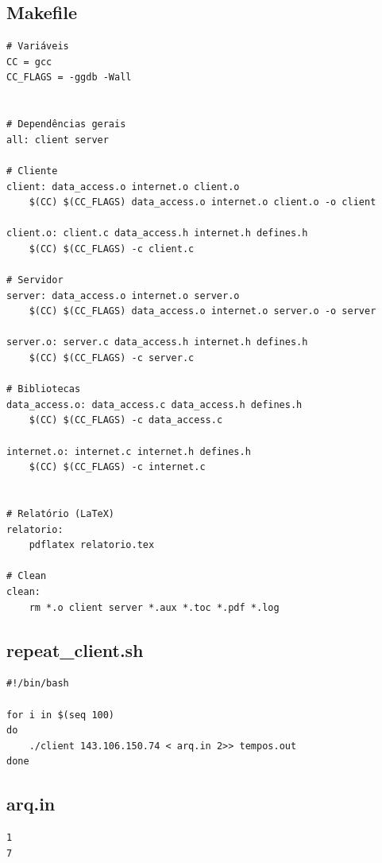 \documentclass[11pt,twoside]{article}
\begin{document}
\subsection{Makefile}
\begin{verbatim}
# Variáveis
CC = gcc
CC_FLAGS = -ggdb -Wall


# Dependências gerais
all: client server

# Cliente
client: data_access.o internet.o client.o
	$(CC) $(CC_FLAGS) data_access.o internet.o client.o -o client

client.o: client.c data_access.h internet.h defines.h
	$(CC) $(CC_FLAGS) -c client.c

# Servidor
server: data_access.o internet.o server.o
	$(CC) $(CC_FLAGS) data_access.o internet.o server.o -o server

server.o: server.c data_access.h internet.h defines.h
	$(CC) $(CC_FLAGS) -c server.c

# Bibliotecas
data_access.o: data_access.c data_access.h defines.h
	$(CC) $(CC_FLAGS) -c data_access.c

internet.o: internet.c internet.h defines.h
	$(CC) $(CC_FLAGS) -c internet.c


# Relatório (LaTeX)
relatorio:
	pdflatex relatorio.tex

# Clean
clean:
	rm *.o client server *.aux *.toc *.pdf *.log
\end{verbatim}

\subsection{repeat\_client.sh}
\begin{verbatim}
#!/bin/bash

for i in $(seq 100)
do
    ./client 143.106.150.74 < arq.in 2>> tempos.out
done
\end{verbatim}

\subsection{arq.in}
\begin{verbatim}
1
7
\end{verbatim}
\end{document}
